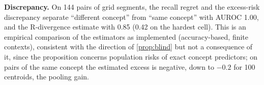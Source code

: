 \documentclass[11pt]{article}
\theoremstyle{plain}
\theoremstyle{definition}
\theoremstyle{remark}
\newcommand{\method}{\textsc{MICE}}   %
\begin{document}
\begin{table}[t]
  \centering
  \caption{Isolated resource benchmark (registered; one process on an RTX 5000 Ada, GPU memory capped at 28\,GB;
  first 300 batches of three real segments; mean over the three prefixes of the mean over three repetitions).
  Seconds per batch (\method{} including its two-level rule and segment processing), rows per second, peak allocated
  and reserved GPU memory and peak process memory (GB), and accuracy (\%) on the same prefixes.}
  \label{tab:cost}
  \small
  \setlength{\tabcolsep}{3pt}
\end{table}

\textbf{Discrepancy.} On 144 pairs of grid segments, the recall regret and the
excess-risk discrepancy separate ``different concept'' from ``same concept'' with AUROC 1.00, and the R-divergence
estimate with 0.85 (0.42 on the hardest cell). This is an empirical comparison of the estimators as implemented
(accuracy-based, finite contexts), consistent with the direction of \cref{prop:blind} but not a consequence of it,
since the proposition concerns population risks of exact concept predictors; on pairs of the same concept the
estimated excess is negative, down to $-0.2$ for 100 centroids, the pooling gain.
\end{document}
